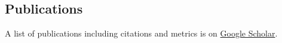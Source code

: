 \documentclass[margin,line]{res}
\newenvironment{list1}{
  \begin{list}{$\cdot$}{%
      \setlength{\itemsep}{0in}
      \setlength{\parsep}{0in} \setlength{\parskip}{0in}
      \setlength{\topsep}{0in} \setlength{\partopsep}{0in} 
      \setlength{\leftmargin}{0.17in}}}{\end{list}}
\begin{document}
\begin{resume}
  

      
  \section{\sc Publications}

  A list of publications including citations and metrics is on \href{https://scholar.google.com/citations?user=ClJ1ExwAAAAJ&sortby=pubdate}{Google Scholar}.
  

\end{resume}
\end{document}
